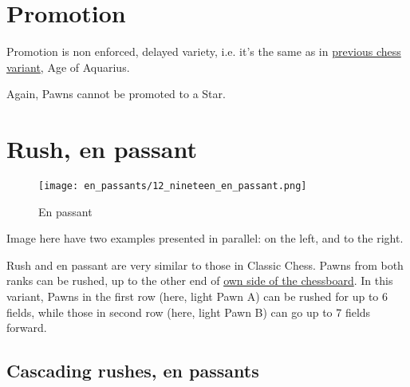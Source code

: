 \clearpage %

\section*{Promotion}
\label{sec:Nineteen/Promotion}

Promotion is non enforced, delayed variety, i.e. it's the same as in
\hyperref[sec:Age of Aquarius/Promotion]{previous chess variant}, Age of Aquarius.

\noindent
Again, Pawns cannot be promoted to a Star.



\section*{Rush, en passant}
\label{sec:Nineteen/Rush, en passant}

\vspace*{-0.3\baselineskip}
\noindent
\begin{wrapfigure}[14]{l}{0.4\textwidth}
\centering
\texttt{[image: en\_passants/12\_nineteen\_en\_passant.png]}
\caption{En passant}
\label{fig:12_nineteen_en_passant}
\end{wrapfigure}
Image here have two examples presented in parallel: on the left, and to the right.

Rush and en passant are very similar to those in Classic Chess.\newline
\indent
Pawns from both ranks can be rushed, up to the other end of
\hyperref[sec:Definitions/Chessboard sides, navigation]{own side of the chessboard}.\newline
\indent
In this variant, Pawns in the first row (here, light Pawn A) can be rushed for up
to 6 fields, while those in second row (here, light Pawn B) can go up to 7 fields
forward.

\clearpage %

\subsection*{Cascading rushes, en passants}
\label{sec:Nineteen/Rush, en passant/Cascading rushes, en passants}


